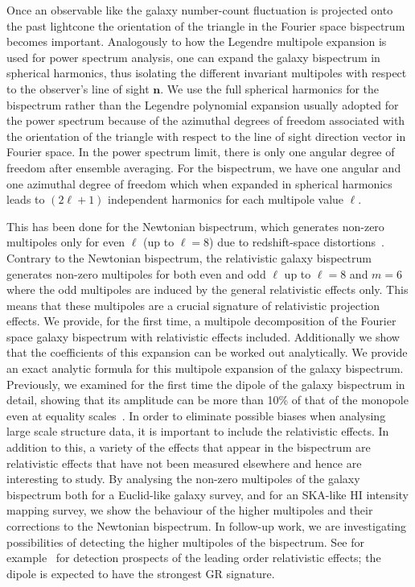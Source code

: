 Once an observable like the galaxy number-count fluctuation is projected onto the past lightcone the orientation of the triangle in the Fourier space bispectrum becomes important. 
Analogously to how the Legendre multipole expansion is used for power spectrum analysis, one can expand the galaxy bispectrum in spherical harmonics, thus isolating the different invariant multipoles with respect to the observer's line of sight $\bm n$. We use the full spherical harmonics for the bispectrum rather than the Legendre polynomial expansion usually adopted for the power spectrum because of the azimuthal degrees of freedom associated with the orientation of the triangle with respect to the line of sight direction vector in Fourier space. In the power spectrum limit, there is only one angular degree of freedom after ensemble averaging. For the bispectrum, we have one angular and one azimuthal degree of freedom which when expanded in spherical harmonics leads to $(2\ell + 1)$ independent harmonics for each multipole value $\ell$. 

This has been done for the Newtonian bispectrum, which generates non-zero multipoles only for even 
\(\ell\) (up to \(\ell = 8\)) due to redshift-space distortions~\cite{Scoccimarro_1999,Nan:2017oaq}. Contrary to the Newtonian bispectrum, the relativistic galaxy bispectrum generates non-zero multipoles for both even and odd \(\ell\) up to \(\ell = 8\) and \(m = 6\) where the odd multipoles are induced by the general relativistic effects only. This means that these multipoles are a crucial signature of relativistic projection effects. We provide, for the first time, a multipole decomposition of the Fourier space galaxy bispectrum with relativistic effects included. Additionally we show that the coefficients of this expansion can be worked out analytically. We provide an exact analytic formula for this multipole expansion of the galaxy bispectrum. Previously, we examined for the first time the dipole of the galaxy bispectrum in detail, showing that its amplitude can be more than 10\% of that of the monopole even at equality scales~\cite{Clarkson:2018dwn}. 
In order to eliminate possible biases when analysing large scale structure data, it is important to include the relativistic effects. In addition to this, a variety of the effects that appear in the bispectrum are relativistic effects that have not been measured elsewhere and hence are interesting to study. By analysing the non-zero multipoles of the galaxy bispectrum both for a Euclid-like galaxy survey, and for an SKA-like HI intensity mapping survey, we show the behaviour of the higher multipoles and their corrections to the Newtonian bispectrum. In follow-up work, we are investigating possibilities of detecting the higher multipoles of the bispectrum. See for example~\cite{Maartens:2019yhx} for detection prospects of the leading order relativistic effects; the dipole is expected to have the strongest GR signature. 

